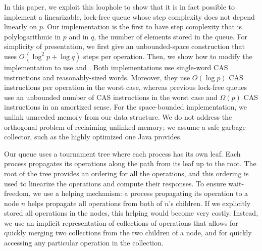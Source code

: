 In this paper, we exploit this loophole to show that it is in fact possible to implement a linearizable, lock-free queue
whose step complexity does not depend linearly on $p$.
Our implementation is the first to have step complexity that is polylogarithmic in $p$ and in $q$, the number of elements
stored in the queue.
For simplicity of presentation, we first give an unbounded-space construction that uses
$O(\log^2 p + \log q)$ steps per operation.
Then, we show how to modify the implementation to use 
 and .
Both implementations use single-word CAS instructions and reasonably-sized words.
Moreover, they use $O(\log p)$ CAS instructions per operation in the worst case, whereas previous
lock-free queues use an unbounded number of CAS instructions in the worst case
and $\Omega(p)$ CAS instructions in an amortized sense.
For the space-bounded implementation, we unlink unneeded memory from our data structure.
We do not address the orthogonal problem of reclaiming unlinked memory; we assume a safe
garbage collector, such as the highly optimized one Java provides.

Our queue uses a tournament tree where each process has its own leaf.
Each process propagates its operations along the path from its leaf up to the root.
The root of the tree provides an ordering for all the operations,
and this ordering is used to linearize the operations and compute their responses.
To ensure wait-freedom, we use a helping mechanism:  a process propagating its operation 
to a node $n$ helps propagate all operations from both of $n$'s children.
If we explicitly stored all operations in the nodes, this helping would become very costly.
Instead, we use an implicit representation of collections
of operations that allows for quickly merging two collections from the two children of a node,
and for quickly accessing any particular operation in the collection.
